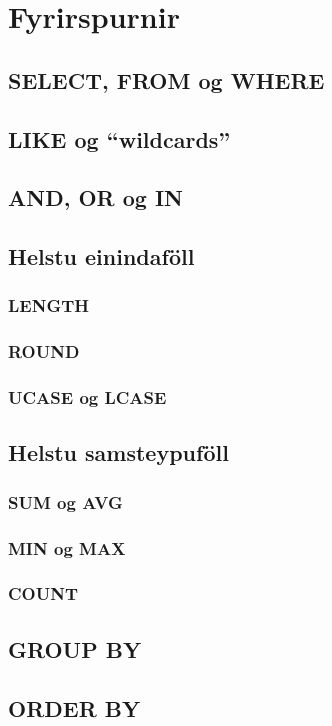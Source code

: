 \documentclass[nohyper,notoc,justified]{tufte-book}
\begin{document}
\chapter{Fyrirspurnir}
\section{SELECT, FROM og WHERE}
\section{LIKE og ``wildcards''}
\section{AND, OR og IN}
\section{Helstu einindaföll}
\subsection{LENGTH}
\subsection{ROUND}
\subsection{UCASE og LCASE}
\section{Helstu samsteypuföll}
\subsection{SUM og AVG}
\subsection{MIN og MAX}
\subsection{COUNT}
\section{GROUP BY}
\section{ORDER BY}
\end{document}
